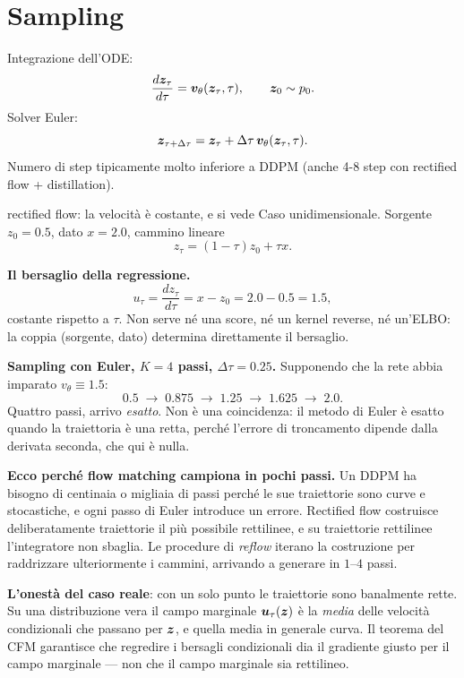 \section{Sampling}

Integrazione dell'ODE:
\[
\frac{d\bm{z}_\tau}{d\tau} = \bm{v}_\theta(\bm{z}_\tau, \tau), \qquad \bm{z}_0 \sim p_0.
\]
Solver Euler:
\[
\bm{z}_{\tau+\Delta\tau} = \bm{z}_\tau + \Delta\tau\, \bm{v}_\theta(\bm{z}_\tau, \tau).
\]
Numero di step tipicamente molto inferiore a DDPM (anche 4-8 step con rectified flow + distillation).

\begin{esempiosvolto}{rectified flow: la velocità è costante, e si vede}
Caso unidimensionale. Sorgente $z_0 = 0.5$, dato $x = 2.0$, cammino lineare
\[
z_\tau = (1-\tau)z_0 + \tau x.
\]

\textbf{Il bersaglio della regressione.}
\[
u_\tau = \frac{dz_\tau}{d\tau} = x - z_0 = 2.0 - 0.5 = 1.5,
\]
costante rispetto a $\tau$. Non serve né una score, né un kernel reverse, né un'ELBO: la coppia (sorgente, dato) determina direttamente il bersaglio.

\medskip
\textbf{Sampling con Euler, $K = 4$ passi, $\Delta\tau = 0.25$.} Supponendo che la rete abbia imparato $v_\theta \equiv 1.5$:
\[
0.5 \;\to\; 0.875 \;\to\; 1.25 \;\to\; 1.625 \;\to\; 2.0.
\]
Quattro passi, arrivo \emph{esatto}. Non è una coincidenza: il metodo di Euler è esatto quando la traiettoria è una retta, perché l'errore di troncamento dipende dalla derivata seconda, che qui è nulla.

\medskip
\textbf{Ecco perché flow matching campiona in pochi passi.} Un DDPM ha bisogno di centinaia o migliaia di passi perché le sue traiettorie sono curve e stocastiche, e ogni passo di Euler introduce un errore. Rectified flow costruisce deliberatamente traiettorie il più possibile rettilinee, e su traiettorie rettilinee l'integratore non sbaglia. Le procedure di \emph{reflow} iterano la costruzione per raddrizzare ulteriormente i cammini, arrivando a generare in $1$--$4$ passi.

\textbf{L'onestà del caso reale}: con un solo punto le traiettorie sono banalmente rette. Su una distribuzione vera il campo marginale $\bm{u}_\tau(\bm{z})$ è la \emph{media} delle velocità condizionali che passano per $\bm{z}$, e quella media in generale curva. Il teorema del CFM garantisce che regredire i bersagli condizionali dia il gradiente giusto per il campo marginale — non che il campo marginale sia rettilineo.
\end{esempiosvolto}

